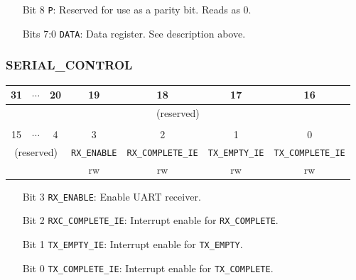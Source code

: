 \documentclass[11pt,openany]{report}
\begin{document}
\begin{enumerate}
\item[Bit 8] \verb|P|: Reserved for use as a parity bit. Reads as 0.
\item[Bits 7:0] \verb|DATA|: Data register. See description above.
\end{enumerate}

\subsubsection{SERIAL\_CONTROL}
\begin{center}
  \begin{tabular}{|c|c|c|c|c|c|c|}
    \hline
    31 & $\cdots$ & 20 & 19 & 18 & 17 & 16  \\
    \hline
    \multicolumn{7}{|c|}{\multirow{2}{*}{(reserved)}}\\
    \multicolumn{7}{|c|}{}\\
    \hline
    \multicolumn{7}{c}{}\\
    \hline
    15 & $\cdots$ & 4 & 3 & 2 & 1 & 0 \\
    \hline
    \multicolumn{3}{|c|}{\multirow{2}{*}{(reserved)}} & \texttt{RX\_ENABLE} & \texttt{RX\_COMPLETE\_IE} & \texttt{TX\_EMPTY\_IE} & \texttt{TX\_COMPLETE\_IE} \\
    \cline{4-7}
    \multicolumn{3}{|c|}{} & rw & rw & rw & rw\\
    \hline
  \end{tabular}
\end{center}

\begin{enumerate}
\item[Bit 3] \verb|RX_ENABLE|: Enable UART receiver.
\item[Bit 2] \verb|RXC_COMPLETE_IE|: Interrupt enable for \verb|RX_COMPLETE|.
\item[Bit 1] \verb|TX_EMPTY_IE|: Interrupt enable for \verb|TX_EMPTY|.
\item[Bit 0] \verb|TX_COMPLETE_IE|: Interrupt enable for \verb|TX_COMPLETE|.
\end{enumerate}
\end{document}
